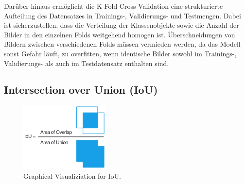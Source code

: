 Darüber hinaus ermöglicht die K-Fold Cross Validation eine strukturierte Aufteilung des Datensatzes in Trainings-, Validierungs- und Testmengen. Dabei ist sicherzustellen, dass die Verteilung der Klassenobjekte sowie die Anzahl der Bilder in den einzelnen Folds weitgehend homogen ist. Überschneidungen von Bildern zwischen verschiedenen Folds müssen vermieden werden, da das Modell sonst Gefahr läuft, zu overfitten, wenn identische Bilder sowohl im Trainings-, Validierungs- als auch im Testdatensatz enthalten sind.

\subsection{Intersection over Union (IoU)}

\begin{figure}[h]
    \centering
    \includegraphics[width=0.4\textwidth]{images/011Fundamentals/IoU.png}
    \caption{Graphical Visualiziation for IoU. \cite{iou_pic}}
    \label{fig:IoU}
\end{figure}

